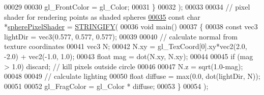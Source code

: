 \begin{DoxyCode}
00029 
00030     gl\_FrontColor = gl\_Color;
00031 \}
00032                            );
00033 
00034 \textcolor{comment}{// pixel shader for rendering points as shaded spheres}
\hypertarget{shaders_8cpp_source_l00035}{}\hyperlink{shaders_8cpp_abad1d2b70401d6f3a4f61a462369373d}{00035} \textcolor{keyword}{const} \textcolor{keywordtype}{char} *\hyperlink{shaders_8cpp_abad1d2b70401d6f3a4f61a462369373d}{spherePixelShader} = \hyperlink{shaders_8cpp_ab06e1eb2e9bf38e0d452b1f796aed208}{STRINGIFY}(
00036                                     \textcolor{keywordtype}{void} main()
00037 \{
00038     \textcolor{keyword}{const} vec3 lightDir = vec3(0.577, 0.577, 0.577);
00039 
00040     \textcolor{comment}{// calculate normal from texture coordinates}
00041     vec3 N;
00042     N.xy = gl\_TexCoord[0].xy*vec2(2.0, -2.0) + vec2(-1.0, 1.0);
00043     \textcolor{keywordtype}{float} mag = dot(N.xy, N.xy);
00044 
00045     \textcolor{keywordflow}{if} (mag > 1.0) discard;   \textcolor{comment}{// kill pixels outside circle}
00046 
00047     N.z = sqrt(1.0-mag);
00048 
00049     \textcolor{comment}{// calculate lighting}
00050     \textcolor{keywordtype}{float} diffuse = max(0.0, dot(lightDir, N));
00051 
00052     gl\_FragColor = gl\_Color * diffuse;
00053 \}
00054                                 );
\end{DoxyCode}
